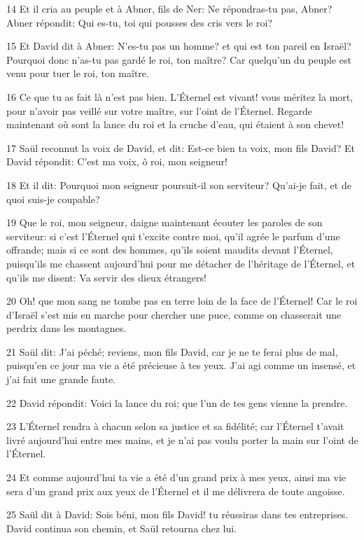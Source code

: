 \par 14 Et il cria au peuple et à Abner, fils de Ner: Ne répondras-tu pas, Abner? Abner répondit: Qui es-tu, toi qui pousses des cris vers le roi?
\par 15 Et David dit à Abner: N'es-tu pas un homme? et qui est ton pareil en Israël? Pourquoi donc n'as-tu pas gardé le roi, ton maître? Car quelqu'un du peuple est venu pour tuer le roi, ton maître.
\par 16 Ce que tu as fait là n'est pas bien. L'Éternel est vivant! vous méritez la mort, pour n'avoir pas veillé sur votre maître, sur l'oint de l'Éternel. Regarde maintenant où sont la lance du roi et la cruche d'eau, qui étaient à son chevet!
\par 17 Saül reconnut la voix de David, et dit: Est-ce bien ta voix, mon fils David? Et David répondit: C'est ma voix, ô roi, mon seigneur!
\par 18 Et il dit: Pourquoi mon seigneur poursuit-il son serviteur? Qu'ai-je fait, et de quoi suis-je coupable?
\par 19 Que le roi, mon seigneur, daigne maintenant écouter les paroles de son serviteur: si c'est l'Éternel qui t'excite contre moi, qu'il agrée le parfum d'une offrande; mais si ce sont des hommes, qu'ils soient maudits devant l'Éternel, puisqu'ils me chassent aujourd'hui pour me détacher de l'héritage de l'Éternel, et qu'ils me disent: Va servir des dieux étrangers!
\par 20 Oh! que mon sang ne tombe pas en terre loin de la face de l'Éternel! Car le roi d'Israël s'est mis en marche pour chercher une puce, comme on chasserait une perdrix dans les montagnes.
\par 21 Saül dit: J'ai péché; reviens, mon fils David, car je ne te ferai plus de mal, puisqu'en ce jour ma vie a été précieuse à tes yeux. J'ai agi comme un insensé, et j'ai fait une grande faute.
\par 22 David répondit: Voici la lance du roi; que l'un de tes gens vienne la prendre.
\par 23 L'Éternel rendra à chacun selon sa justice et sa fidélité; car l'Éternel t'avait livré aujourd'hui entre mes mains, et je n'ai pas voulu porter la main sur l'oint de l'Éternel.
\par 24 Et comme aujourd'hui ta vie a été d'un grand prix à mes yeux, ainsi ma vie sera d'un grand prix aux yeux de l'Éternel et il me délivrera de toute angoisse.
\par 25 Saül dit à David: Sois béni, mon fils David! tu réussiras dans tes entreprises. David continua son chemin, et Saül retourna chez lui.

